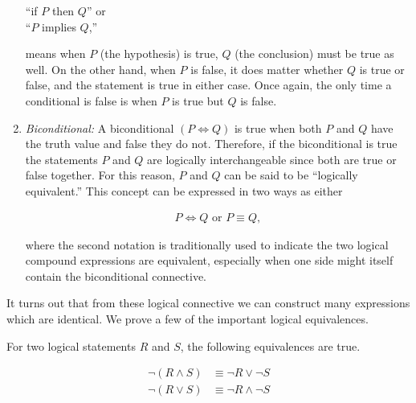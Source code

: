 \begin{enumerate}
	\vspace{\baselineskip}
	\begin{center}
			``if $P$ then $Q$'' or \\
			``$P$ implies $Q$,''
	\end{center}
	\vspace{\baselineskip}
	
	  means when $P$ (the hypothesis) is true, $Q$ (the conclusion) must be true as well. On the other hand, when $P$ is false, it does matter whether $Q$ is true or false, and the statement is true in either case. Once again, the only time a conditional is false is when $P$ is true but $Q$ is false.
	  
	  \item \emph{Biconditional:} A biconditional $(P \iff Q)$ is true when both $P$ and $Q$ have the truth value and false they do not. Therefore, if the biconditional is true the statements $P$ and $Q$ are logically interchangeable since both are true or false together. For this reason, $P$ and $Q$ can be said to be ``logically equivalent.'' This concept can be expressed in two ways as either
	  	  
	  \begin{align*}
	  	P \iff Q \text{ or } P \equiv Q,
	  \end{align*}
	  
	  where the second notation is traditionally used to indicate the two logical compound expressions are equivalent, especially when one side might itself contain the biconditional connective.
\end{enumerate}

It turns out that from these logical connective we can construct many expressions which are identical. We prove a few of the important logical equivalences. \\

\begin{theorem}
	For two logical statements $R$ and $S$, the following equivalences are true.
	
	\begin{align}
		\neg(R \wedge S) &\equiv \neg R \lor \neg S \\
		\neg(R \lor S) &\equiv \neg R \wedge \neg S
	\end{align}
\end{theorem}

